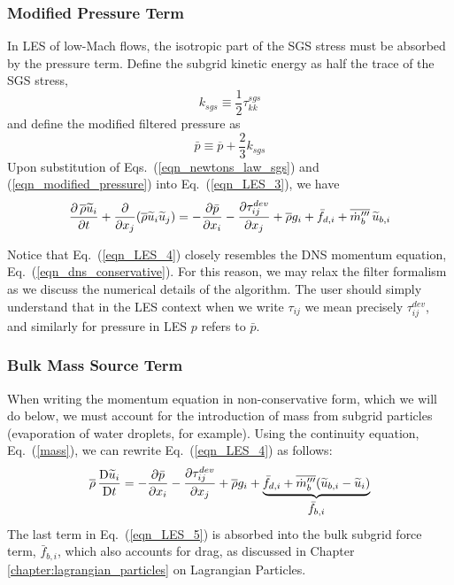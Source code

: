\subsubsection*{Modified Pressure Term}

In LES of low-Mach flows, the isotropic part of the SGS stress must be absorbed by the pressure term.  Define the subgrid kinetic energy as half the trace of the SGS stress,
\begin{equation}
\label{eqn_ksgs_2}
k_{sgs} \equiv \frac{1}{2} \tau_{kk}^{sgs}
\end{equation}
and define the modified filtered pressure \cite{Pope:2000} as
\begin{equation}
\label{eqn_modified_pressure}
\bar{p} \equiv \overline{p} + \frac{2}{3}k_{sgs}
\end{equation}
Upon substitution of Eqs.~(\ref{eqn_newtons_law_sgs}) and (\ref{eqn_modified_pressure}) into Eq.~(\ref{eqn_LES_3}), we have
\begin{equation}
\label{eqn_LES_4}
\frac{\partial \,\overline{\rho} \widetilde{u}_i}{\partial t} + \frac{\partial}{\partial x_j} (\overline{\rho} \widetilde{u}_i \widetilde{u}_j) = -\frac{\partial \bar{p}}{\partial x_i} - \frac{\partial \tau_{ij}^{dev}}{\partial x_j} + \overline{\rho} g_i + \bar{f}_{d,i} + \overline{\dot{m}_b^{\prime\prime\prime}} \, \widetilde{u}_{b,i}
\end{equation}

Notice that Eq.~(\ref{eqn_LES_4}) closely resembles the DNS momentum equation, Eq.~(\ref{eqn_dns_conservative}).  For this reason, we may relax the filter formalism as we discuss the numerical details of the algorithm.  The user should simply understand that in the LES context when we write $\tau_{ij}$ we mean precisely $\tau_{ij}^{dev}$, and similarly for pressure in LES $p$ refers to $\bar{p}$.

\subsubsection*{Bulk Mass Source Term}

When writing the momentum equation in non-conservative form, which we will do below, we must account for the introduction of mass from subgrid particles (evaporation of water droplets, for example).  Using the continuity equation, Eq.~(\ref{mass}), we can rewrite Eq.~(\ref{eqn_LES_4}) as follows:
\begin{equation}
\label{eqn_LES_5}
\overline{\rho} \,\frac{\mathrm{D} \widetilde{u}_i}{\mathrm{D} t} = -\frac{\partial \bar{p}}{\partial x_i} - \frac{\partial \tau_{ij}^{dev}}{\partial x_j} + \overline{\rho} g_i + \underbrace{\bar{f}_{d,i} + \overline{\dot{m}_b^{{\prime\prime\prime}}} (\widetilde{u}_{b,i} - \widetilde{u}_i)}_{\displaystyle\bar{f}_{b,i}}
\end{equation}
The last term in Eq.~(\ref{eqn_LES_5}) is absorbed into the bulk subgrid force term, $\bar{f}_{b,i}$, which also accounts for drag, as discussed in Chapter \ref{chapter:lagrangian_particles} on Lagrangian Particles.

